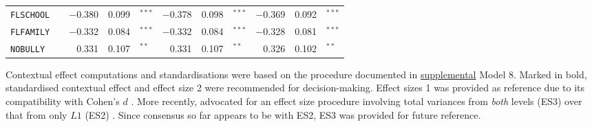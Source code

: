 {\begin{tabular}{l c rr@{\hskip -0.1mm}l rr@{\hskip -0.1mm}l rr@{\hskip -0.1mm}l}
        \texttt{FLSCHOOL} &       & $-$0.380 & 0.099 & $^{***}$   & $-$0.378 & 0.098 & $^{***}$   & $-$0.369 & 0.092 & $^{***}$ \\
        \texttt{FLFAMILY} &       & $-$0.332 & 0.084 & $^{***}$   & $-$0.332 & 0.084 & $^{***}$   & $-$0.328 & 0.081 & $^{***}$ \\
        \texttt{NOBULLY} &       & 0.331 & 0.107 & $^{**}$    & 0.331 & 0.107 & $^{**}$    & 0.326 & 0.102 & $^{**}$ \\
        \bottomrule
        \end{tabular}
}{Contextual effect computations and standardisations were based on the procedure documented in  \href{https://www.statmodel.com/download/Marsh Ludtke et al 2009 Doubly-latent Models of BFLPE  MBR full appendix .pdf}{supplemental} Model 8. Marked in bold, standardised contextual effect and effect size 2 were recommended for decision-making. Effect sizes 1 \parencite{tymms:2004} was provided as reference due to its compatibility with Cohen's $d$ \parencite{cohen:1992}. More recently, \textcite{marsh:2009} advocated for an effect size procedure involving total variances from \emph{both} levels (ES3) over that from only $L1$ (ES2) \parencite[see][p. 792]{marsh:2009}. Since consensus so far appears to be with ES2, ES3 was provided for future reference.}
